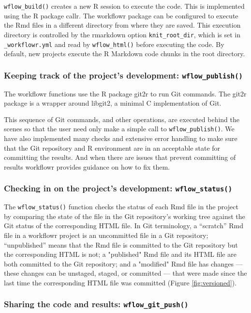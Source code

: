 \documentclass[9pt,a4paper]{extarticle}
\begin{document}
\texttt{wflow\_build()} creates a new R session to execute the code. This is
implemented using the R package callr. The workflowr package can be
configured to execute the Rmd files in a different directory from where
they are saved. This execution directory is controlled by the rmarkdown
option \verb|knit_root_dir|, which is set in \verb| _workflowr.yml| and
read by \texttt{wflow\_html()} before executing the code. By default, new projects
execute the R Markdown code chunks in the root directory.

\subsubsection*{Keeping track of the project's development: \texttt{wflow\_publish()}}

The workflowr functions use the R package git2r to run Git commands. The
git2r package is a wrapper around libgit2, a minimal C implementation of
Git.

This sequence of Git commands, and other operations, are executed behind
the scenes so that the user need only make a simple call to
\texttt{wflow\_publish()}. We have also implemented many checks and extensive
error handling to make sure that the Git repository and R environment
are in an acceptable state for committing the results. And when there
are issues that prevent committing of results workflowr provides
guidance on how to fix them.

\subsubsection*{Checking in on the project's development: \texttt{wflow\_status()}}

The \texttt{wflow\_status()} function checks the status of each Rmd file in the
project by comparing the state of the file in the Git repository's
working tree against the Git status of the corresponding HTML file. In
Git terminology, a “scratch” Rmd file in a workflowr project is an
uncommitted file in a Git repository; “unpublished” means that the Rmd
file is committed to the Git repository but the corresponding HTML is
not; a "published" Rmd file and its HTML file are both committed to the
Git repository; and a "modified" Rmd file has changes --- these changes
can be unstaged, staged, or committed --- that were made since the last
time the corresponding HTML file was committed (Figure \ref{fig:versioned}).

\subsubsection*{Sharing the code and results: \texttt{wflow\_git\_push()}}
\end{document}
